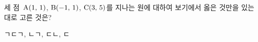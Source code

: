 세 점~$\mathrm{A}(1,\,1)$, $\mathrm{B}(-1,\,1)$, $\mathrm{C}(3,\,5)$를 지나는 원에 대하여 보기에서 옳은 것만을 있는 대로 고른 것은? 
\begin{choices32}{ㄱ}{ㄷ}{ㄱ, ㄴ}{ㄱ, ㄷ}{ㄴ, ㄷ}\end{choices32}

